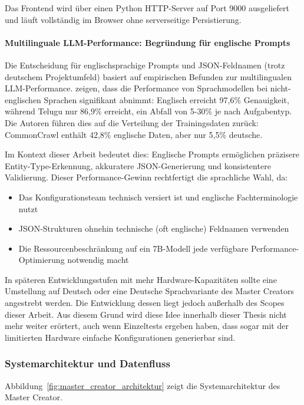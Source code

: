 \noindent Das Frontend wird über einen Python HTTP-Server auf Port 9000 ausgeliefert und läuft vollständig im Browser ohne serverseitige Persistierung.

\paragraph{Multilinguale LLM-Performance: Begründung für englische Prompts}

Die Entscheidung für englischsprachige Prompts und JSON-Feldnamen (trotz deutschem Projektumfeld) basiert auf empirischen Befunden zur multilingualen LLM-Performance. \cite{gupta:multilingual2025} zeigen, dass die Performance von Sprachmodellen bei nicht-englischen Sprachen signifikant abnimmt: Englisch erreicht 97,6\% Genauigkeit, während Telugu nur 86,9\% erreicht, ein Abfall von 5-30\% je nach Aufgabentyp. Die Autoren führen dies auf die Verteilung der Trainingsdaten zurück: CommonCrawl enthält 42,8\% englische Daten, aber nur 5,5\% deutsche.

\noindent Im Kontext dieser Arbeit bedeutet dies: Englische Prompts ermöglichen präzisere Entity-Type-Erkennung, akkuratere JSON-Generierung und konsistentere Validierung. Dieser Performance-Gewinn rechtfertigt die sprachliche Wahl, da:

\begin{itemize}
    \item Das Konfigurationsteam technisch versiert ist und englische Fachterminologie nutzt
    \item JSON-Strukturen ohnehin technische (oft englische) Feldnamen verwenden
    \item Die Ressourcenbeschränkung auf ein 7B-Modell jede verfügbare Performance-Optimierung notwendig macht
\end{itemize}
\noindent In späteren Entwicklungsstufen mit mehr Hardware-Kapazitäten sollte eine Umstellung auf Deutsch oder eine Deutsche Sprachvariante des Master Creators angestrebt werden. Die Entwicklung dessen liegt jedoch außerhalb des Scopes dieser Arbeit. Aus diesem Grund wird diese Idee innerhalb dieser Thesis nicht mehr weiter erörtert, auch wenn Einzeltests ergeben haben, dass sogar mit der limitierten Hardware einfache Konfigurationen generierbar sind.
\subsubsection{Systemarchitektur und Datenfluss}

Abbildung~\ref{fig:master_creator_architektur} zeigt die Systemarchitektur des Master Creator.

